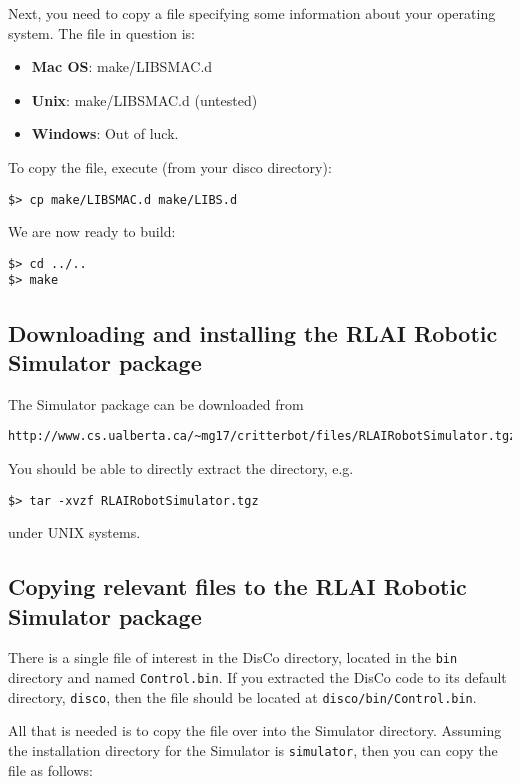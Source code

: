 \documentclass[12pt]{article}
\begin{document}
Next, you need to copy a file specifying some information about your operating
system. The file in question is:

\begin{itemize}
\item{\textbf{Mac OS}: make/LIBSMAC.d}
\item{\textbf{Unix}: make/LIBSMAC.d (untested)}
\item{\textbf{Windows}: Out of luck.}
\end{itemize}

To copy the file, execute (from your disco directory): 

\begin{verbatim}$> cp make/LIBSMAC.d make/LIBS.d \end{verbatim}

We are now ready to build:
\begin{verbatim}
$> cd ../.. 
$> make
\end{verbatim}

\subsection{Downloading and installing the RLAI Robotic Simulator package}

The Simulator package can be downloaded from

\begin{verbatim}
http://www.cs.ualberta.ca/~mg17/critterbot/files/RLAIRobotSimulator.tgz
\end{verbatim}

You should be able to directly extract the directory, e.g.

\begin{verbatim}$> tar -xvzf RLAIRobotSimulator.tgz \end{verbatim}

under UNIX systems.

\subsection{Copying relevant files to the RLAI Robotic Simulator package}

There is a single file of interest in the DisCo directory, located in the
\verb+bin+ directory and named \verb+Control.bin+. If you extracted the 
DisCo code to its default directory, \verb+disco+, then the file should 
be located at \verb+disco/bin/Control.bin+.

All that is needed is to copy the file over into the Simulator directory.
Assuming the installation directory for the Simulator is \verb+simulator+,
then you can copy the file as follows:
\end{document}
